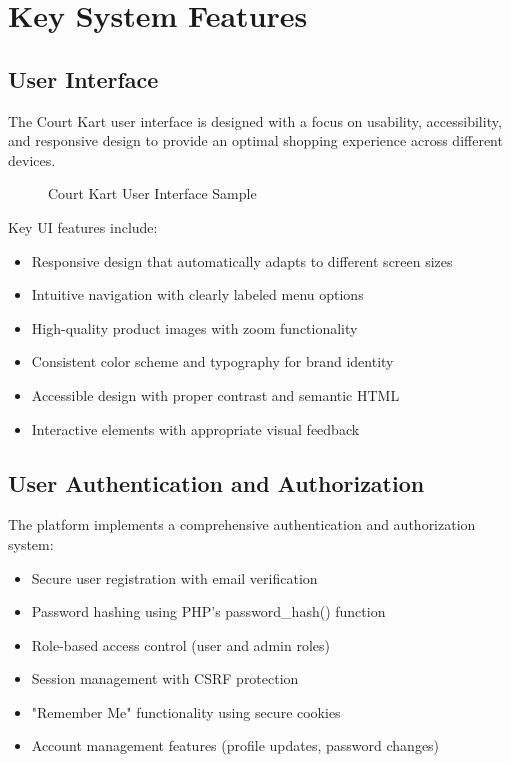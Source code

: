 \documentclass[14pt,a4paper]{article}
\begin{document}
\section{Key System Features}

\subsection{User Interface}
The Court Kart user interface is designed with a focus on usability, accessibility, and responsive design to provide an optimal shopping experience across different devices.

\begin{figure}[H]
	\centering
	\caption{Court Kart User Interface Sample}
	\label{fig:ui}
\end{figure}

Key UI features include:
\begin{itemize}
	\item Responsive design that automatically adapts to different screen sizes
	\item Intuitive navigation with clearly labeled menu options
	\item High-quality product images with zoom functionality
	\item Consistent color scheme and typography for brand identity
	\item Accessible design with proper contrast and semantic HTML
	\item Interactive elements with appropriate visual feedback
\end{itemize}

\subsection{User Authentication and Authorization}

The platform implements a comprehensive authentication and authorization system:

\begin{itemize}
	\item Secure user registration with email verification
	\item Password hashing using PHP's password\_hash() function
	\item Role-based access control (user and admin roles)
	\item Session management with CSRF protection
	\item "Remember Me" functionality using secure cookies
	\item Account management features (profile updates, password changes)
\end{itemize}
\end{document}
